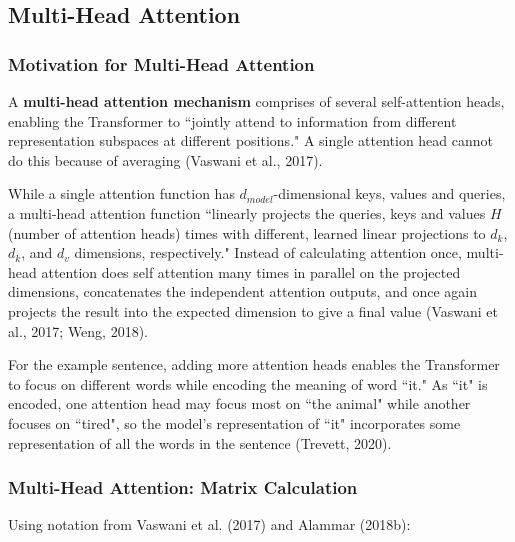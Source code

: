 \subsection{Multi-Head Attention} \label{sec:MultiHeadAttention}

\subsubsection{Motivation for Multi-Head Attention}


A \textbf{multi-head attention mechanism} comprises of several self-attention heads, enabling the Transformer to ``jointly attend to information from different representation subspaces at different positions." A single attention head cannot do this because of averaging (Vaswani et al., 2017).  

While a single attention function has $d_{model}$-dimensional keys, values and queries, a multi-head attention function ``linearly projects the queries, keys and values $H$ (number of attention heads) times with different, learned linear projections to $d_k$, $d_k$, and $d_v$ dimensions, respectively." Instead of calculating attention once, multi-head attention does self attention many times in parallel on the projected dimensions, concatenates the independent attention outputs, and once again projects the result into the expected dimension to give a final value (Vaswani et al., 2017; Weng, 2018).  

For the example sentence, adding more attention heads enables the Transformer to focus on different words while encoding the meaning of word ``it." As ``it" is encoded, one attention head may focus most on ``the animal" while another focuses on ``tired", so the model's representation of ``it" incorporates some representation of all the words in the sentence (Trevett, 2020). 

\subsubsection{Multi-Head Attention: Matrix Calculation}

Using notation from Vaswani et al. (2017) and Alammar (2018b): 

